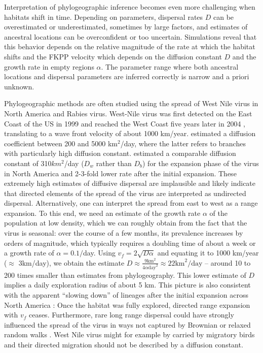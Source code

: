 \documentclass[aps,rmp, twocolumn]{revtex4}
\newcommand{\vfkpp}{v_f}
\begin{document}
Interpretation of phylogeographic inference becomes even more challenging when habitats shift in time.
Depending on parameters, dispersal rates $D$ can be overestimated or underestimated, sometimes by large factors, and estimates of ancestral locations can be overconfident or too uncertain.
Simulations reveal that this behavior depends on the relative magnitude of the rate at which the habitat shifts and the FKPP velocity which depends on the diffusion constant $D$ and the growth rate in empty regions $\alpha$.
The parameter range where both ancestral locations and dispersal parameters are inferred correctly is narrow and a priori unknown.

Phylogeographic methods are often studied using the spread of West Nile virus in North America and Rabies virus.
West-Nile virus was first detected on the East Coast of the US in 1999 and reached the West Coast five years later in 2004 \citep{pybus_unifying_2012}, translating to a wave front velocity of about 1000 km/year.
\citet{pybus_unifying_2012} estimated a diffusion coefficient between 200 and 5000 km$^2$/day, where the latter refers to branches with particularly high diffusion constant.
\citet{dellicour_how_2024} estimated a comparable diffusion constant of 310$km^2$/day ($D_w$ rather than $D_b$) for the expansion phase of the virus in North America and 2-3-fold lower rate after the initial expansion.
These extremely high estimates of diffusive dispersal are implausible and likely indicate that directed elements of the spread of the virus are interpreted as undirected dispersal.
Alternatively, one can interpret the spread from east to west as a range expansion.
To this end, we need an estimate of the growth rate $\alpha$ of the population at low density, which we can roughly obtain from the fact that the virus is seasonal: over the course of a few months, its prevalence increases by orders of magnitude, which typically requires a doubling time of about a week or a growth rate of $\alpha=0.1/$day.
Using $\vfkpp = 2\sqrt{D\alpha}$ and equating it to 1000 km/year ($\approx$ 3km/day), we obtain the estimate $D\approx \frac{9 \mathrm{km}^2}{4 \alpha \mathrm{day}^2} \approx 22\mathrm{km}^2/\mathrm{day}$ -- around 10 to 200 times smaller than estimates from phylogeography.
This lower estimate of $D$ implies a daily exploration radius of about 5 km.
This picture is also consistent with the apparent ``slowing down'' of lineages after the initial expansion across North America \citep{dellicour_epidemiological_2020, dellicour_how_2024}: Once the habitat was fully explored, directed range expansion with $\vfkpp$ ceases.
Furthermore, rare long range dispersal could have strongly influenced the spread of the virus in ways not captured by Brownian or relaxed random walks \citep{hallatschek_acceleration_2014}.
West Nile virus might for example by carried by migratory birds and their directed migration should not be described by a diffusion constant.
\end{document}
